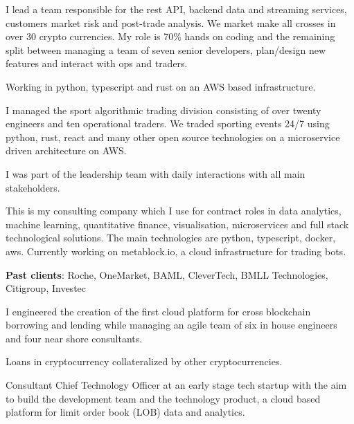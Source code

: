
I lead a team responsible for the rest API,
backend data and streaming services, customers market risk and post-trade analysis.
We market make all crosses in over 30 crypto currencies.
My role is 70\% hands on coding and the remaining split
between managing a team of seven senior developers, plan/design new features and interact with ops and traders.

Working in python, typescript and rust on an AWS based infrastructure.


I managed the sport algorithmic trading division consisting of over twenty engineers and ten operational traders.
We traded sporting events 24/7 using python, rust, react and many other open source technologies on a
microservice driven architecture on AWS.

I was part of the leadership team with daily interactions with all main stakeholders.


This is my consulting company which I use for contract roles in data analytics, machine learning, quantitative finance,
visualisation, microservices and full stack technological solutions. The main technologies are python, typescript, docker, aws.
Currently working on \textcolor{sectcol}{metablock.io}, a cloud infrastructure for trading bots.

    {\bf Past clients}: Roche, OneMarket, BAML, CleverTech, BMLL Technologies, Citigroup, Investec



I engineered the creation of the first cloud platform for cross blockchain borrowing and lending
while managing an agile team of six in house engineers and four near shore consultants.

Loans in cryptocurrency collateralized by other cryptocurrencies.



Consultant Chief Technology Officer at an early stage tech startup with the aim to build the development team and the technology product,
a cloud based platform for limit order book (LOB) data and analytics.

